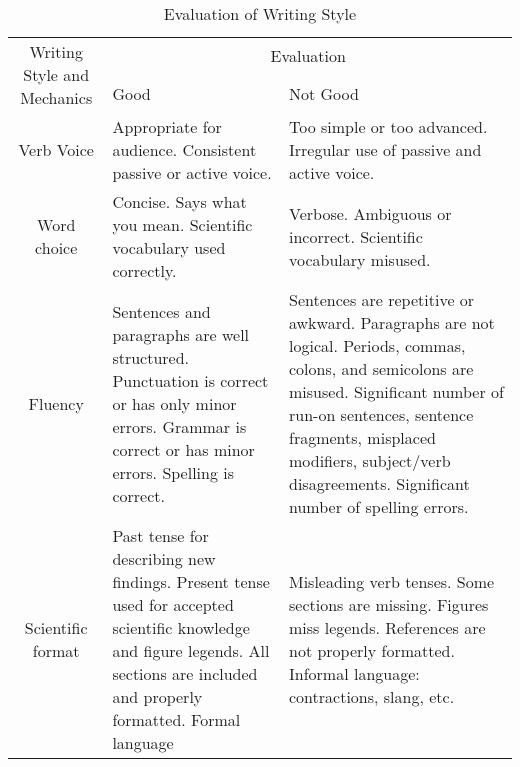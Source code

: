 \documentclass[10pt,conference,compsocconf]{IEEEtran}
\begin{document}
\begin{table*}
	\centering
	\caption{Evaluation of Writing Style}\label{tab:writing_evaluation}
	\begin{tabular}{c|l|l}
		\toprule
		\multirow{2}{*}{Writing Style and Mechanics} & \multicolumn{2}{c}{Evaluation} \\
		\cmidrule{2-3}
		& Good & Not Good\\
		\midrule
		Verb Voice  & \parbox{4cm}{Appropriate for audience. Consistent passive or active voice.} & \parbox{4cm}{Too simple or too advanced. Irregular use of passive and active voice.}\\
		\midrule
		Word choice  & \parbox{4cm}{Concise. Says what you mean. Scientific  vocabulary used correctly.} & \parbox{4cm}{Verbose. Ambiguous or incorrect. Scientific vocabulary misused.}\\
		\midrule
		Fluency  & \parbox{4cm}{Sentences and paragraphs are well structured. Punctuation is correct or has only minor errors. Grammar is correct or has minor errors. Spelling is correct.} & \parbox{4cm}{Sentences are repetitive or awkward. Paragraphs are not logical. Periods, commas, colons, and semicolons are misused. Significant number of run-on sentences, sentence fragments, misplaced modifiers, subject/verb disagreements. Significant number of spelling errors.}\\
		\midrule
		Scientific format   & \parbox{4cm}{Past tense for describing new findings. Present tense used for accepted scientific knowledge and figure legends. All sections are included and properly formatted. Formal language} & \parbox{4cm}{Misleading verb tenses. Some sections are missing. Figures miss legends. References are not properly formatted. Informal language: contractions, slang, etc.}\\
		\bottomrule
	\end{tabular}
\end{table*}
\end{document}
